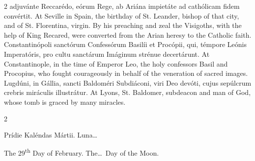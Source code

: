\begin{paracol}{2}
 adjuvánte Reccarédo, eórum Rege, ab Ariána impietáte ad cathólicam fidem 
 convértit.
\switchcolumn
{}
At Seville in Spain, the birthday of St. Leander, bishop of that city, and 
 of St. Florentina, virgin. By his preaching and zeal the Visigoths, 
 with the help of King Recared, were converted from the Arian heresy to the 
 Catholic faith.
\switchcolumn*
{}
Constantinópoli sanctórum Confessórum Basilíi 
 et Procópii, qui, témpore Leónis Imperatóris, pro cultu sanctárum Imáginum 
 strénue decertárunt.
\switchcolumn
{}
At Constantinople, in the time of Emperor Leo, the holy confessors Basil and 
 Procopius, who fought courageously in behalf of the veneration of sacred 
 images.
\switchcolumn*
{}
Lugdúni, in Gállia, sancti Baldoméri Subdiáconi, viri Deo devóti, cujus 
 sepúlcrum crebris miráculis illustrátur.
\switchcolumn
{}
At Lyons, St. Baldomer, subdeacon and man of God, whose tomb is graced by 
 many miracles.
\switchcolumn*
{}
\end{paracol}


\begin{paracol}{2}
\begin{center}{\color{gregoriocolor} Prídie Kaléndas Mártii. 
 Luna\dots\ }\end{center}
\switchcolumn
{}
\begin{center}{\color{gregoriocolor} The 29\textsuperscript{th} Day of February. The\dots\ Day of the Moon.}\end{center}
\end{paracol}

